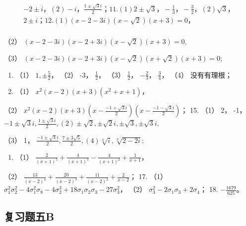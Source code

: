\[
\begin{array}{l} - 2 \pm i\text{，} (2) - i\text{，} \frac {1 \pm \sqrt {3} i}{2}\text{；} 11. (1) 2 \pm \sqrt {3}\text{，} - \frac {1}{3}\text{，} - \frac {3}{2}\text{，} (2) \sqrt {3}\text{，} \\ 2 \pm i\text{；} 12. (1) (x - 2 - 3 i) (x - \sqrt {2}) (x + 3) = 0\text{，} \\ \end{array}
\]

（2） \((x - 2 - 3i)(x - 2 + 3i)(x - \sqrt{2})(x + 3) = 0,\)

（3）
\((x - 2 - 3i)(x - 2 + 3i)(x - \sqrt{2})(x + \sqrt{2})(x + 3) = 0;\)

\begin{enumerate}[start=13]
\item
  （1） \(1, \pm\frac{5}{2}\)， （2） -3， \(\frac{1}{2}\)， （3）
  \(\frac{1}{2}\)， \(-\frac{2}{3}\)， \(\frac{3}{4}\)， （4）
  没有有理根；
\item
  （1） \(x^{2}(x - 2)(x + 3)(x^{2} + x + 1)\)，
\end{enumerate}

（2）
\(x^{2}(x - 2)(x + 3)\left(x - \frac{-1 + \sqrt{3}i}{2}\right)\left(x - \frac{-1 - \sqrt{3}i}{2}\right)\)；
15. （1） 2，
-1，\(-1 \pm \sqrt{3} i, \frac{1 \pm \sqrt{3} i}{2}, (2) \pm \sqrt{2}, \pm \sqrt{2} i, \pm \sqrt{3}, \pm \sqrt{3} i,\)

（3） 1，
\(\frac{-1 \pm \sqrt{3} i}{2}, \frac{7 \pm 3\sqrt{5}}{2}, (4)\sqrt[3]{i}, \sqrt[3]{2 - 2i};\)

\begin{enumerate}[start=16]
\item
  （1）
  \(\frac{2}{(x + 1)^5} + \frac{4}{(x + 1)^3} - \frac{4}{(x + 1)^2} + \frac{1}{x + 1}\)，
\end{enumerate}

（2）
\(\frac{13}{(x - 2)^4} + \frac{20}{(x - 2)^3} + \frac{11}{(x - 2)^2} + \frac{2}{x - 2}\)；
17. （1）
\(\sigma_1^2\sigma_2^2 - 4\sigma_1^2\sigma_8 - 4\sigma_2^3 + 18\sigma_1\sigma_2\sigma_3 - 27\sigma_3^2\)，
（2） \(\sigma_3^2 - 2\sigma_1\sigma_3 + 2\sigma_4\)； 18.
\(-\frac{1679}{625}\)。

\subsection{复习题五B}

